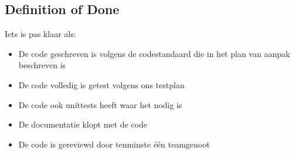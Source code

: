 \subsection{Definition of Done}
Iets is pas klaar als:
\begin{itemize}
    \item De code geschreven is volgens de codestandaard die in het plan
          van aanpak beschreven is\
    \item De code volledig is getest volgens ons testplan
    \item De code ook unittests heeft waar het nodig is
    \item De documentatie klopt met de code
    \item De code is gereviewd door tenminste één teamgenoot
\end{itemize}
